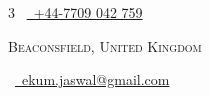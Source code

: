 \documentclass[a4paper,10pt]{extarticle} %
\begin{document}
\pagestyle{empty} %


\begin{multicols}{3}
\normalsize \faPhone\ {\href{tel:07709042759|}{\  +44-7709 042 759}}

\columnbreak

\par{\par} %
\par{\centering\normalsize {\textsc{Beaconsfield, United Kingdom}}\hfill\par}
\columnbreak
\raggedright\hfill\normalsize \faEnvelope\ {\href{mailto:ekum.jaswal@gmail.com}{\  ekum.jaswal@gmail.com}}\\
\end{multicols}

\end{document}
